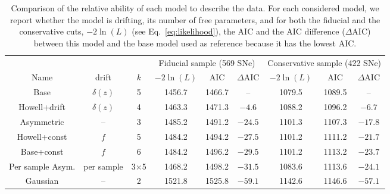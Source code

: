 \documentclass[]{aa}
\begin{document}
\begin{table}
    \centering
    \caption{Comparison of the relative ability of each model to describe the
        data. For each considered model, we report whether the model is drifting, its number of free parameters, and for both the fiducial and the
        conservative cuts, $-2\ln(L)$ (see Eq.~\ref{eq:likelihood}), the AIC and
        the AIC difference ($\Delta$AIC) between this model and the base model
        used as reference because it has the lowest AIC.}
    \label{tab:comp}
    \begin{tabular}{ccc|ccc|ccc}
        \hline\hline
        & & & \multicolumn{3}{c}{Fiducial sample (569 SNe)}
            & \multicolumn{3}{|c}{Conservative sample (422 SNe)} \\
        Name & drift & $k$ &
        $-2\ln(L)$ & AIC & $\Delta$AIC & $-2\ln(L)$ & AIC & $\Delta$AIC\\
        \hline

        Base & $\delta(z)$ & 5
        & 1456.7 & 1466.7 & -- 
        & 1079.5 & 1089.5 & -- \\

        Howell+drift & $\delta(z)$ & 4
        & 1463.3 & 1471.3 & $-4.6$
        & 1088.2 & 1096.2 & $-6.7$ 
        \\

        Asymmetric & -- & 3
        & 1485.2 & 1491.2 & $-24.5$
        & 1101.3 & 1107.3 & $-17.8$ 
        \\

        Howell+const & $f$ & 5
        & 1484.2 & 1494.2 & $-27.5$
        & 1101.2 & 1111.2 & $-21.7$ 
        \\

        Base+const & $f$ & 6
        & 1484.2 & 1496.2 & $-29.5$
        & 1101.2 & 1113.2 & $-23.7$ 
        \\

        Per sample Asym. & per sample & 3$\times$5
        & 1468.2 & 1498.2 & $-31.5$
        & 1083.6 & 1113.6 & $-24.1$ 
        \\

        Gaussian & -- & 2
        & 1521.8 & 1525.8 & $-59.1$
        & 1142.6 & 1146.6 & $-57.1$ 
        \\
        \hline
    \end{tabular}
\end{table}
\end{document}
